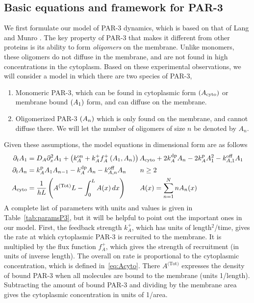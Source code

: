 \documentclass[11pt]{article}
\newcommand{\6}[1]{#1_{\text{6}}}
\newcommand{\3}[1]{#1_{\text{3}}}
\newcommand{\Tot}[1]{#1^\text{(Tot)}}
\newcommand{\A}[1]{#1_A}
\begin{document}
\subsection{Basic equations and framework for PAR-3 \label{sec:Par3}}
We first formulate our model of PAR-3 dynamics, which is based on that of Lang and Munro \cite{lang2022oligomerization}. The key property of PAR-3 that makes it different from other proteins is its ability to form \emph{oligomers} on the membrane. Unlike monomers, these oligomers do not diffuse in the membrane, and are not found in high concentrations in the cytoplasm. Based on these experimental observations, we will consider a model in which there are two species of PAR-3, 
\begin{enumerate}
\item Monomeric PAR-3, which can be found in cytoplasmic form $(A_\text{cyto})$ or membrane bound $(A_1)$ form, and can diffuse on the membrane.
\item Oligomerized PAR-3 $(A_n)$ which is only found on the membrane, and cannot diffuse there. We will let the number of oligomers of size $n$ be denoted by $A_n$. 
\end{enumerate}
Given these assumptions, the model equations in dimensional form are as follows
\begin{subequations}
\label{eq:P3model}
\begin{align}
\Dt \MA & = \A{D} \Dx^2 \MA + \left(\A{\kon}+\A{\kf}\A{f}^+\left(\MA,\PA\right)\right)  \MAC + 2\A{\kdp}\PA -2\A{\kp} \MA^2 - \koff_{A,1}\MA \\
\Dt A_n & =\A{\kp}\MA A_{n-1}- \A{\kdp}A_n-\koff_{A,n}A_n \qquad n \geq 2 \\ \label{eq:Acyto}
A_\text{cyto} & = \frac{1}{h L} \left(\Tot{A} L - \int_0^L A(x) \, dx \right) \qquad A(x) =\sum_{n=1}^N n A_n(x)
\end{align}
\end{subequations}
A complete list of parameters with units and values is given in Table\ \ref{tab:paramsP3}, but it will be helpful to point out the important ones in our model. First, the feedback strength $k_A^+$, which has units of length$^2$/time, gives the rate at which cytoplasmic PAR-3 is recruited to the membrane. It is multiplied by the flux function $f_A^+$, which gives the strength of recruitment (in units of inverse length). The overall on rate is proportional to the cytoplasmic concentration, which is defined in\ \eqref{eq:Acyto}. There $\Tot{A}$ expresses the density of bound PAR-3 when all molecules are bound to the membrane (units 1/length). Subtracting the amount of bound PAR-3 and dividing by the membrane area gives
the cytoplasmic concentration in units of 1/area.
\end{document}
